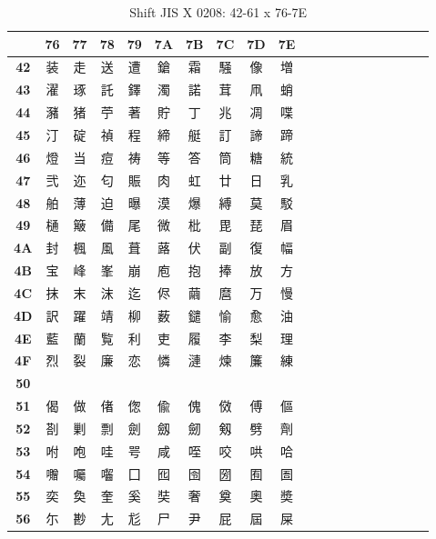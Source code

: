 \begin{table}[H]
\Fontified
\centering
\caption{Shift JIS X 0208: 42-61 x 76-7E}
\begin{tabular}{|Sc|Sc|Sc|Sc|Sc|Sc|Sc|Sc|Sc|Sc|}
\hline
 & \textbf{76} & \textbf{77} & \textbf{78} & \textbf{79} & \textbf{7A} & \textbf{7B} & \textbf{7C} & \textbf{7D} & \textbf{7E} \\ \hline
\textbf{42} & 装 & 走 & 送 & 遭 & 鎗 & 霜 & 騒 & 像 & 増 \\ \hline
\textbf{43} & 濯 & 琢 & 託 & 鐸 & 濁 & 諾 & 茸 & 凧 & 蛸 \\ \hline
\textbf{44} & 瀦 & 猪 & 苧 & 著 & 貯 & 丁 & 兆 & 凋 & 喋 \\ \hline
\textbf{45} & 汀 & 碇 & 禎 & 程 & 締 & 艇 & 訂 & 諦 & 蹄 \\ \hline
\textbf{46} & 燈 & 当 & 痘 & 祷 & 等 & 答 & 筒 & 糖 & 統 \\ \hline
\textbf{47} & 弐 & 迩 & 匂 & 賑 & 肉 & 虹 & 廿 & 日 & 乳 \\ \hline
\textbf{48} & 舶 & 薄 & 迫 & 曝 & 漠 & 爆 & 縛 & 莫 & 駁 \\ \hline
\textbf{49} & 樋 & 簸 & 備 & 尾 & 微 & 枇 & 毘 & 琵 & 眉 \\ \hline
\textbf{4A} & 封 & 楓 & 風 & 葺 & 蕗 & 伏 & 副 & 復 & 幅 \\ \hline
\textbf{4B} & 宝 & 峰 & 峯 & 崩 & 庖 & 抱 & 捧 & 放 & 方 \\ \hline
\textbf{4C} & 抹 & 末 & 沫 & 迄 & 侭 & 繭 & 麿 & 万 & 慢 \\ \hline
\textbf{4D} & 訳 & 躍 & 靖 & 柳 & 薮 & 鑓 & 愉 & 愈 & 油 \\ \hline
\textbf{4E} & 藍 & 蘭 & 覧 & 利 & 吏 & 履 & 李 & 梨 & 理 \\ \hline
\textbf{4F} & 烈 & 裂 & 廉 & 恋 & 憐 & 漣 & 煉 & 簾 & 練 \\ \hline
\textbf{50} &  &  &  &  &  &  &  &  &  \\ \hline
\textbf{51} & 偈 & 做 & 偖 & 偬 & 偸 & 傀 & 傚 & 傅 & 傴 \\ \hline
\textbf{52} & 剳 & 剿 & 剽 & 劍 & 劔 & 劒 & 剱 & 劈 & 劑 \\ \hline
\textbf{53} & 咐 & 咆 & 哇 & 咢 & 咸 & 咥 & 咬 & 哄 & 哈 \\ \hline
\textbf{54} & 囎 & 囑 & 囓 & 囗 & 囮 & 囹 & 圀 & 囿 & 圄 \\ \hline
\textbf{55} & 奕 & 奐 & 奎 & 奚 & 奘 & 奢 & 奠 & 奧 & 奬 \\ \hline
\textbf{56} & 尓 & 尠 & 尢 & 尨 & 尸 & 尹 & 屁 & 屆 & 屎 \\ \hline

\end{tabular}
\end{table}
